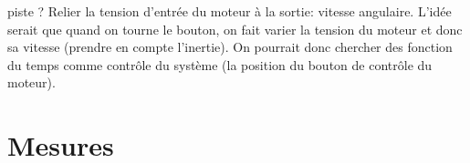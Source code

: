 \documentclass[11pt,a4paper]{article}
\begin{document}
piste ? Relier la tension d'entrée du moteur à la sortie: vitesse angulaire. L'idée serait que quand on tourne le bouton, on fait varier la tension du moteur et donc sa vitesse (prendre en compte l'inertie). On pourrait donc chercher des fonction du temps comme contrôle du système (la position du bouton de contrôle du moteur).



\section{Mesures}




 
\end{document}
